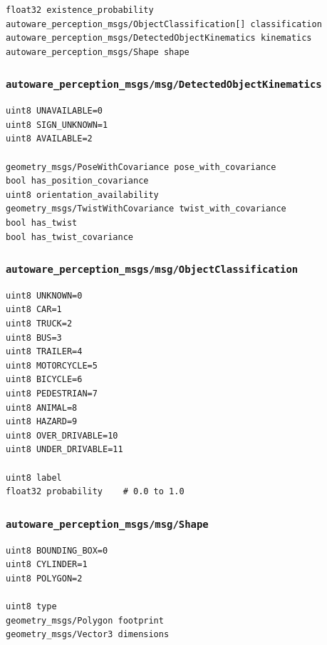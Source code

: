 \documentclass[
]{article}
\begin{document}
\begin{verbatim}
float32 existence_probability
autoware_perception_msgs/ObjectClassification[] classification
autoware_perception_msgs/DetectedObjectKinematics kinematics
autoware_perception_msgs/Shape shape
\end{verbatim}

\subsubsection{\texorpdfstring{\texttt{autoware\_perception\_msgs/msg/DetectedObjectKinematics}}{autoware\_perception\_msgs/msg/DetectedObjectKinematics}}\label{autoware_perception_msgsmsgdetectedobjectkinematics}

\begin{verbatim}
uint8 UNAVAILABLE=0
uint8 SIGN_UNKNOWN=1
uint8 AVAILABLE=2

geometry_msgs/PoseWithCovariance pose_with_covariance
bool has_position_covariance
uint8 orientation_availability
geometry_msgs/TwistWithCovariance twist_with_covariance
bool has_twist
bool has_twist_covariance
\end{verbatim}

\subsubsection{\texorpdfstring{\texttt{autoware\_perception\_msgs/msg/ObjectClassification}}{autoware\_perception\_msgs/msg/ObjectClassification}}\label{autoware_perception_msgsmsgobjectclassification}

\begin{verbatim}
uint8 UNKNOWN=0
uint8 CAR=1
uint8 TRUCK=2
uint8 BUS=3
uint8 TRAILER=4
uint8 MOTORCYCLE=5
uint8 BICYCLE=6
uint8 PEDESTRIAN=7
uint8 ANIMAL=8
uint8 HAZARD=9
uint8 OVER_DRIVABLE=10
uint8 UNDER_DRIVABLE=11

uint8 label
float32 probability    # 0.0 to 1.0
\end{verbatim}

\subsubsection{\texorpdfstring{\texttt{autoware\_perception\_msgs/msg/Shape}}{autoware\_perception\_msgs/msg/Shape}}\label{autoware_perception_msgsmsgshape}

\begin{verbatim}
uint8 BOUNDING_BOX=0
uint8 CYLINDER=1
uint8 POLYGON=2

uint8 type
geometry_msgs/Polygon footprint
geometry_msgs/Vector3 dimensions
\end{verbatim}
\end{document}

